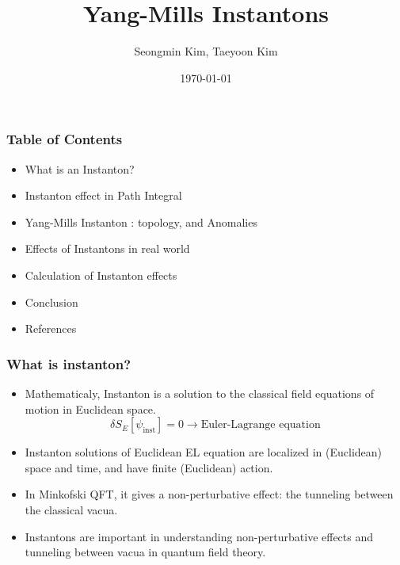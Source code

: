 \documentclass[10pt]{beamer}
\title{Yang-Mills Instantons}
\author{Seongmin Kim, Taeyoon Kim}
\institute{SNU}
\date{\today}
\begin{document}
\frame{\titlepage}

\begin{frame}
\frametitle{Table of Contents}
\begin{itemize}
\item What is an Instanton?
\item Instanton effect in Path Integral
\item Yang-Mills Instanton : topology, and Anomalies
\item Effects of Instantons in real world
\item Calculation of Instanton effects
\item Conclusion
\item References
\end{itemize}
\end{frame}

\begin{frame}
\frametitle{What is instanton?}
\begin{itemize}
\item Mathematicaly, Instanton is a solution to the classical field equations of motion in Euclidean space.
\begin{equation}
    \delta S_E [\psi_{\text{inst}}] = 0 \rightarrow \text{Euler-Lagrange equation}
\end{equation}
\item Instanton solutions of Euclidean EL equation are localized in (Euclidean) space and time, and have finite (Euclidean) action.
\item In Minkofski QFT, it gives a non-perturbative effect: the tunneling between the classical vacua.
\item Instantons are important in understanding non-perturbative effects and tunneling between vacua in quantum field theory.
\end{itemize}
\end{frame}
\end{document}
